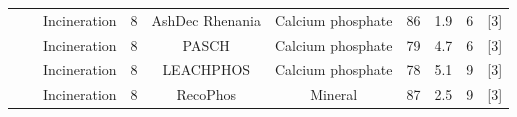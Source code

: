\documentclass[authoryear]{elsarticle}
\begin{document}
\begin{table}
{\begin{threeparttable}
\begin{tabular}{@{}cccccccccc@{}}
				&                                                                                                                                                         & Incineration                                                                     & 8                                      & AshDec Rhenania                                                                          & Calcium phosphate                                                                 & 86                                                                                    & 1.9                                  & 6                                                            &     [3]     \\
				&                                                                                                                                                         & Incineration                                                                     & 8                                      & PASCH                                                                                    & Calcium phosphate                                                                 & 79                                                                                    & 4.7                                  & 6                                                            &     [3]     \\
				&                                                                                                                                                         & Incineration                                                                     & 8                                      & LEACHPHOS                                                                                & Calcium phosphate                                                                 & 78                                                                                    & 5.1                                  & 9                                                            &     [3]     \\
				&                                                                                                                                                         & Incineration                                                                     & 8                                      & RecoPhos                                                                                 & Mineral                                                                           & 87                                                                                    & 2.5                                  & 9                                                            &      [3]    \\

\end{tabular}
\end{threeparttable}}
\end{table}
\end{document}
